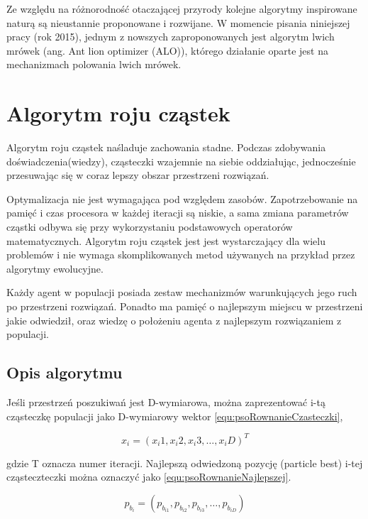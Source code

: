 Ze względu na różnorodność otaczającej przyrody kolejne algorytmy inspirowane naturą są nieustannie proponowane i rozwijane. W momencie pisania niniejszej pracy (rok 2015), jednym z nowszych zaproponowanych jest algorytm lwich mrówek (ang. Ant lion optimizer (ALO))\cite{ALO}, którego działanie oparte jest na mechanizmach polowania lwich mrówek.

\section{Algorytm roju cząstek}
\label{sec:psoOpis}
Algorytm roju cząstek naśladuje zachowania stadne. Podczas zdobywania doświadczenia(wiedzy), cząsteczki wzajemnie na siebie oddziałując, jednocześnie przesuwając się w coraz lepszy obszar przestrzeni rozwiązań. 

Optymalizacja nie jest wymagająca pod względem zasobów. Zapotrzebowanie na pamięć i czas procesora w każdej iteracji są niskie, a sama zmiana parametrów cząstki odbywa się przy wykorzystaniu podstawowych operatorów matematycznych. Algorytm roju cząstek jest jest wystarczający dla wielu problemów i nie wymaga skomplikowanych metod używanych na przykład przez algorytmy ewolucyjne.

Każdy agent w populacji posiada zestaw mechanizmów warunkujących jego ruch po przestrzeni rozwiązań. Ponadto ma pamięć o najlepszym miejscu w przestrzeni jakie odwiedził, oraz wiedzę o położeniu agenta z najlepszym rozwiązaniem z populacji.

\subsection{Opis algorytmu}
\label{sec:psoRownania}
Jeśli przestrzeń poszukiwań jest D-wymiarowa, można zaprezentować i-tą cząsteczkę populacji jako D-wymiarowy wektor \ref{equ:psoRownanieCzasteczki},

\begin{equation}
\label{equ:psoRownanieCzasteczki}
x_i = (x_i1, x_i2, x_i3, \dots, x_iD)^T
\end{equation}

gdzie T oznacza numer iteracji. Najlepszą odwiedzoną pozycję (particle best) i-tej cząsteczteczki można oznaczyć jako \ref{equ:psoRownanieNajlepszej}.

\begin{equation}
\label{equ:psoRownanieNajlepszej}
p_{b_i} = (p_{b_{i1}}, p_{b_{i2}}, p_{b_{i3}}, \dots, p_{b_{iD}})
\end{equation}

